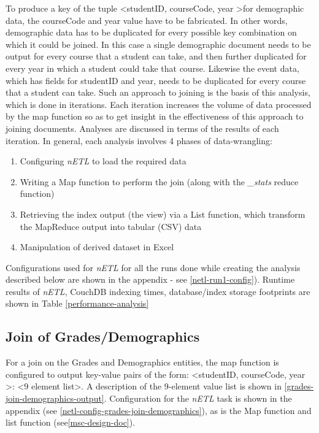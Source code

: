 To produce a key of the tuple \textless studentID, courseCode, year \textgreater for demographic data, the courseCode and year value have to be fabricated. In other words, demographic data has to be duplicated for every possible key combination on which it could be joined. In this case a single demographic document needs to be output for every course that a student can take, and then further duplicated for every year in which a student could take that course. Likewise the event data, which has fields for studentID and year, needs to be duplicated for every course that a student can take. Such an approach to joining is the basis of this analysis, which is done in iterations. Each iteration increases the volume of data processed by the map function so as to get insight in the effectiveness of this approach to joining documents. Analyses are discussed in terms of the results of each iteration. In general, each analysis involves 4 phases of data-wrangling:

\begin{enumerate}
    \item Configuring \textit{nETL} to load the required data
    \item Writing a Map function to perform the join (along with the \textit{\_stats} reduce function)
    \item Retrieving the index output (the view) via a List function, which transform the MapReduce output into tabular (CSV) data
    \item Manipulation of derived dataset in Excel
\end{enumerate}

Configurations used for \textit{nETL} for all the runs done while creating the analysis described below are shown in the appendix - see \ref{netl-run1-config}). Runtime results of \textit{nETL}, CouchDB indexing times, database/index storage footprints are shown in Table \ref{performance-analysis}

\subsection{Join of Grades/Demographics}
For a join on the Grades and Demographics entities, the map function is configured to output key-value pairs of the form: \textless studentID, courseCode, year \textgreater : <9 element list>. A description of the 9-element value list is shown in \ref{grades-join-demographics-output}. Configuration for the \textit{nETL} task is shown in the appendix (see \ref{netl-config-grades-join-demographics}), as is the Map function and list function (see\ref{msc-design-doc}).

